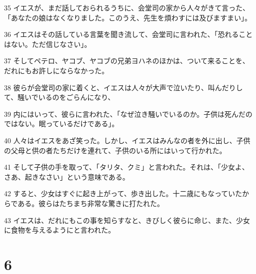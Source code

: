 \par 35 イエスが、まだ話しておられるうちに、会堂司の家から人々がきて言った、「あなたの娘はなくなりました。このうえ、先生を煩わすには及びますまい」。
\par 36 イエスはその話している言葉を聞き流して、会堂司に言われた、「恐れることはない。ただ信じなさい」。
\par 37 そしてペテロ、ヤコブ、ヤコブの兄弟ヨハネのほかは、ついて来ることを、だれにもお許しにならなかった。
\par 38 彼らが会堂司の家に着くと、イエスは人々が大声で泣いたり、叫んだりして、騒いでいるのをごらんになり、
\par 39 内にはいって、彼らに言われた、「なぜ泣き騒いでいるのか。子供は死んだのではない。眠っているだけである」。
\par 40 人々はイエスをあざ笑った。しかし、イエスはみんなの者を外に出し、子供の父母と供の者たちだけを連れて、子供のいる所にはいって行かれた。
\par 41 そして子供の手を取って、「タリタ、クミ」と言われた。それは、「少女よ、さあ、起きなさい」という意味である。
\par 42 すると、少女はすぐに起き上がって、歩き出した。十二歳にもなっていたからである。彼らはたちまち非常な驚きに打たれた。
\par 43 イエスは、だれにもこの事を知らすなと、きびしく彼らに命じ、また、少女に食物を与えるようにと言われた。

\chapter{6}

